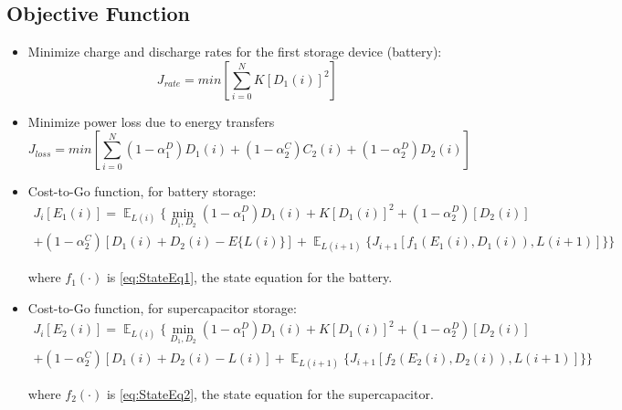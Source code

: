 \documentclass{article}
\begin{document}
	\subsection{Objective Function}
	\begin{itemize}
		\item Minimize charge and discharge rates
		 for the first storage device (battery):
		 \begin{equation}J_{rate}=min\left[\sum_{i=0}^{N}K\left[D_{1}(i)\right]^{2}\right]\end{equation}
 		\item Minimize power loss due to energy transfers
		 \begin{equation}J_{loss}=min\left[\sum_{i=0}^{N}
		 (1-\alpha_{1}^{D})D_{1}(i)+
		 (1-\alpha_{2}^{C})C_{2}(i)+
 		 (1-\alpha_{2}^{D})D_{2}(i)
		  \right]\end{equation}
		  
		  \item Cost-to-Go function, for battery storage:\\
		  \begin{multline}
		  J_{i}[E_{1}(i)] = \mathop{\mathbb{E}}_{L(i)}
		  \{\min_{D_{1},D_{2}}
		  (1-\alpha_{1}^{D})D_{1}(i) 
		  	+ K[D_{1}(i)]^{2}
		  	+(1-\alpha_{2}^{D})[D_{2}(i)]\\	  +(1-\alpha_{2}^{C})[D_{1}(i)+D_{2}(i)-E\{L(i)\}]
		  	+\mathop{\mathbb{E}}_{L(i+1)}\{J_{i+1}[f_{1}(E_{1}(i),D_{1}(i)),L(i+1)]\}\}
		  \end{multline}
		  
		  where $f_{1}(\cdot)$ is \eqref{eq:StateEq1}, the state equation for the battery.
		  
		  \item Cost-to-Go function, for supercapacitor storage:\\
		  \begin{multline}
		  J_{i}[E_{2}(i)] = \mathop{\mathbb{E}}_{L(i)} \{\min_{D_{1},D_{2}}
		  (1-\alpha_{1}^{D})D_{1}(i) 
		  	+ K[D_{1}(i)]^{2}
		  	+(1-\alpha_{2}^{D})[D_{2}(i)]\\	  +(1-\alpha_{2}^{C})[D_{1}(i)+D_{2}(i)-L(i)]
		  	+\mathop{\mathbb{E}}_{L(i+1)} \{J_{i+1}[f_{2}(E_{2}(i),D_{2}(i)),L(i+1)]\}\}
		  \end{multline}
		  
		  where $f_{2}(\cdot)$ is \eqref{eq:StateEq2}, the state equation for the supercapacitor.
	\end{itemize}
	
	
	
\end{document}
